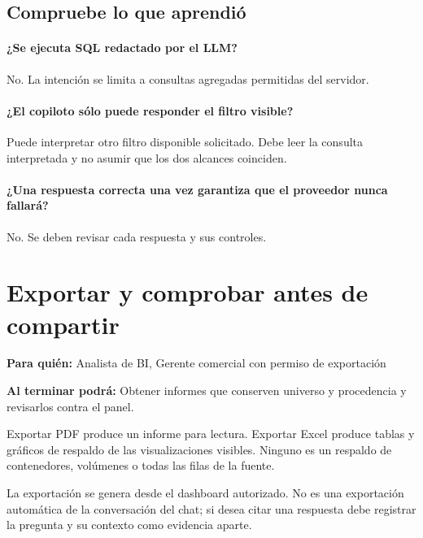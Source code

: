 \subsection{Compruebe lo que aprendió}
\paragraph{¿Se ejecuta SQL redactado por el LLM?} No. La intención se limita a consultas agregadas permitidas del servidor.

\paragraph{¿El copiloto sólo puede responder el filtro visible?} Puede interpretar otro filtro disponible solicitado. Debe leer la consulta interpretada y no asumir que los dos alcances coinciden.

\paragraph{¿Una respuesta correcta una vez garantiza que el proveedor nunca fallará?} No. Se deben revisar cada respuesta y sus controles.


\section{Exportar y comprobar antes de compartir}
\label{unidad:AN04}
\textbf{Para quién:} Analista de BI, Gerente comercial con permiso de exportación\par
\textbf{Al terminar podrá:} Obtener informes que conserven universo y procedencia y revisarlos contra el panel.

Exportar PDF produce un informe para lectura. Exportar Excel produce tablas y gráficos de respaldo de las visualizaciones visibles. Ninguno es un respaldo de contenedores, volúmenes o todas las filas de la fuente.

La exportación se genera desde el dashboard autorizado. No es una exportación automática de la conversación del chat; si desea citar una respuesta debe registrar la pregunta y su contexto como evidencia aparte.

